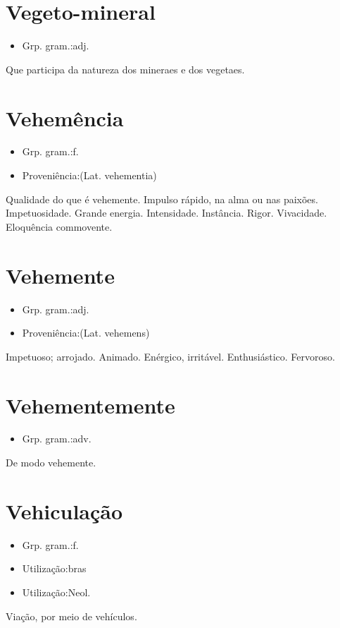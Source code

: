\documentclass{article}
\begin{document}
\section{Vegeto-mineral}
\begin{itemize}
\item {Grp. gram.:adj.}
\end{itemize}
Que participa da natureza dos mineraes e dos vegetaes.
\section{Vehemência}
\begin{itemize}
\item {Grp. gram.:f.}
\end{itemize}
\begin{itemize}
\item {Proveniência:(Lat. \textunderscore vehementia\textunderscore )}
\end{itemize}
Qualidade do que é vehemente.
Impulso rápido, na alma ou nas paixões.
Impetuosidade.
Grande energia.
Intensidade.
Instância.
Rigor.
Vivacidade.
Eloquência commovente.
\section{Vehemente}
\begin{itemize}
\item {Grp. gram.:adj.}
\end{itemize}
\begin{itemize}
\item {Proveniência:(Lat. \textunderscore vehemens\textunderscore )}
\end{itemize}
Impetuoso; arrojado.
Animado.
Enérgico, irritável.
Enthusiástico.
Fervoroso.
\section{Vehementemente}
\begin{itemize}
\item {Grp. gram.:adv.}
\end{itemize}
De modo vehemente.
\section{Vehiculação}
\begin{itemize}
\item {Grp. gram.:f.}
\end{itemize}
\begin{itemize}
\item {Utilização:bras}
\end{itemize}
\begin{itemize}
\item {Utilização:Neol.}
\end{itemize}
Viação, por meio de vehículos.
\end{document}
